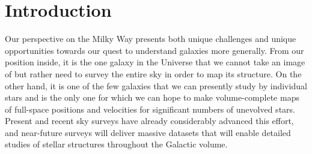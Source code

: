 \documentclass[galaxies,article,submit,moreauthors,pdftex,10pt,a4paper]{mdpi}
\begin{document}


\section{Introduction}

Our perspective on the Milky Way presents both unique challenges and unique opportunities towards our quest to understand galaxies more generally.
From our position inside, it is the one galaxy in the Universe that we cannot take an image of but rather need to survey the entire sky in order to map its structure.
On the other hand, it is one of the few galaxies that we can presently study by individual stars and is the only one for which we can hope to make volume-complete maps of full-space positions and velocities for significant numbers of unevolved stars.
Present and recent sky surveys have already considerably advanced this effort, and near-future surveys will deliver massive datasets that will enable detailed studies of stellar structures throughout the Galactic volume.

\end{document}
